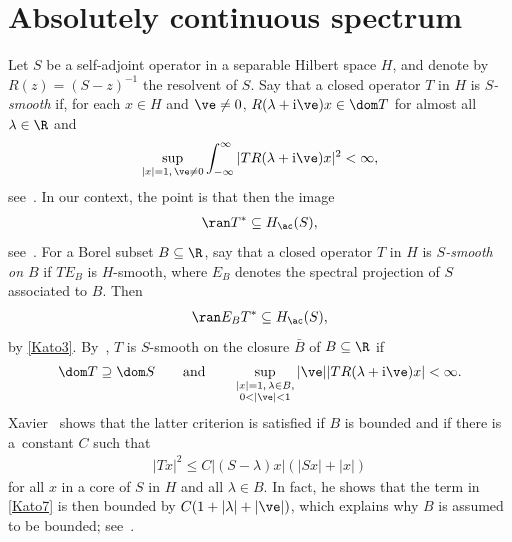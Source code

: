 \section{Absolutely continuous spectrum}%

Let $S$ be a self-adjoint operator in a separable Hilbert space $H$,
and denote by $R(z)=(S-z)^{-1}$ the resolvent of $S$.
Say that a closed operator $T$ in $H$ is \emph{$S$-smooth} if, for each $x\in H$ and $\ve\ne0$,
$R(\lambda+{\rm i}\ve)x\in\dom T$
 for almost all $\lambda\in\R$ and
\begin{align*}%
 \sup_{|x|=1,\,\ve\ne0} \int_{-\infty}^\infty |TR(\lambda+{\rm i}\ve)x|^2 < \infty,
\end{align*}
see~\cite[p.~142]{ReedSimon78}.
In our context, the point is that then the image
\begin{align}\label{Kato3}
 \ran T^* \subseteq H_{\ac}(S),
\end{align}
see~\cite[Theorem XIII.23]{ReedSimon78}.
For a Borel subset $B\subseteq\R$,
say that a closed operator $T$ in $H$ is \emph{$S$-smooth on $B$} if $TE_B$ is $H$-smooth,
where $E_B$ denotes the spectral projection of $S$ associated to $B$.
Then
\begin{align*}%
 \ran E_BT^* \subseteq H_{\ac}(S),
\end{align*}
by \eqref{Kato3}.
By~\cite[Theorem XIII.30]{ReedSimon78}, $T$ is $S$-smooth on the closure $\bar B$ of $B\subseteq\R$ if
\begin{align}\label{Kato7}
 \dom T\supseteq\dom S
 \qquad\text{and}\qquad
 \sup_{\substack{|x|=1, \, \lambda\in B,\\ 0<|\ve|<1}} |\ve||TR(\lambda+{\rm i}\ve)x| < \infty.
\end{align}
Xavier~\cite[p.~581f.]{Xavier1988} shows that the latter criterion is satisfied
if $B$ is bounded and if there is a~constant $C$ such that
\begin{align}\label{Kato9}
 |Tx|^2 \le C|(S-\lambda)x|(|Sx|+|x|)
\end{align}
for all $x$ in a core of $S$ in $H$ and all $\lambda\in B$.
In fact, he shows that the term in \eqref{Kato7} is then bounded by $C(1+|\lambda|+|\ve|)$,
which explains why $B$ is assumed to be bounded; see~\cite[top of~p.~582]{Xavier1988}.

